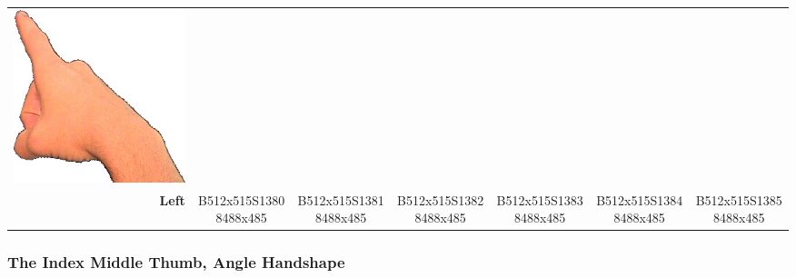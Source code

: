\documentclass{article}
\begin{document}
\begin{center}
\begin{tabular}{r*{6}{c}}
\includegraphics[scale=0.1]{images/03-10-6.jpg}\\
\textbf{Left}&
B512x515S13808488x485&
B512x515S13818488x485&
B512x515S13828488x485&
B512x515S13838488x485&
B512x515S13848488x485&
B512x515S13858488x485\\
\end{tabular}
\end{center}

\subsubsection{The Index Middle Thumb, Angle Handshape}
\end{document}
